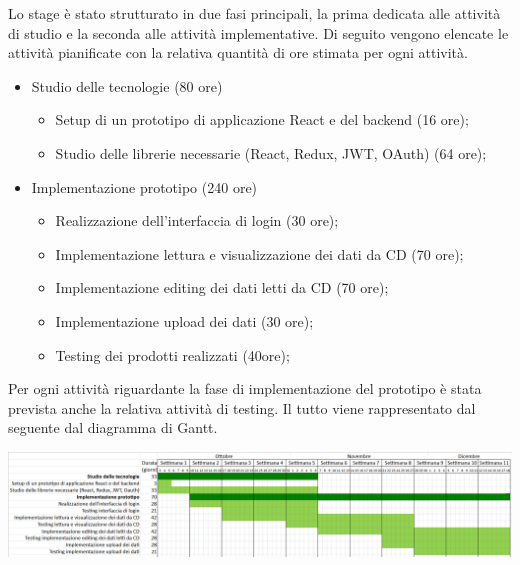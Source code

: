 Lo stage è stato strutturato in due fasi principali, la prima dedicata alle attività di studio e la seconda alle attività implementative. Di seguito vengono elencate le attività pianificate con la relativa quantità di ore stimata per ogni attività.

\begin{itemize}
\item Studio delle tecnologie (80 ore)
\begin{itemize}
\item Setup di un prototipo di applicazione React e del backend (16 ore);
\item Studio delle librerie necessarie (React, Redux, JWT, OAuth) (64 ore);
\end{itemize}
\item Implementazione prototipo (240 ore)
\begin{itemize}
\item Realizzazione dell’interfaccia di login (30 ore);
\item Implementazione lettura e visualizzazione dei dati da CD (70 ore);
\item Implementazione editing dei dati letti da CD (70 ore);
\item Implementazione upload dei dati (30 ore);
\item Testing dei prodotti realizzati (40ore);
\end{itemize}
\end{itemize}

Per ogni attività riguardante la fase di implementazione del prototipo è stata prevista anche la relativa attività di testing.
Il tutto viene rappresentato dal seguente dal diagramma di Gantt.
\begin{center}
	\includegraphics[width=14cm]{immagini/gantt.png}
\end{center}